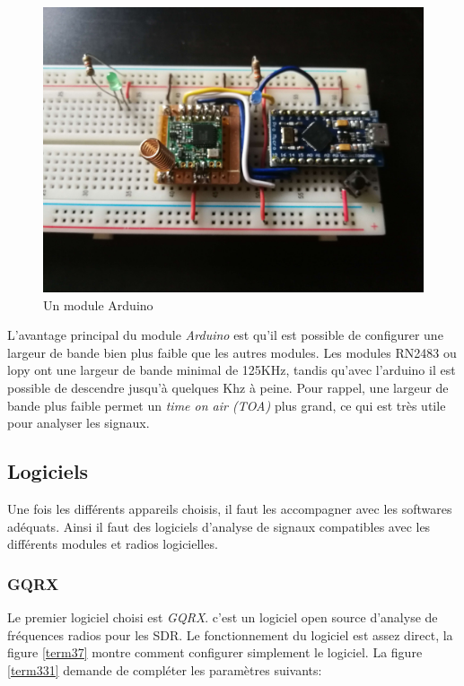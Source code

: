 \begin{figure}[h]
\centering

\includegraphics[scale=0.08]{images/arduino.png}
\caption{Un module Arduino}\label{term36}
\end{figure}

L'avantage principal du module \textit{Arduino} est qu'il est possible de configurer une largeur de bande bien plus faible que les autres modules. Les modules RN2483 ou lopy ont une largeur de bande minimal de 125KHz, tandis qu'avec l'arduino il est possible de descendre jusqu'à quelques Khz à peine. Pour rappel, une largeur de bande plus faible permet un \textit{time on air (TOA)} plus grand, ce qui est très utile pour analyser les signaux. 

\subsection{Logiciels}\label{fft}

Une fois les différents appareils choisis, il faut les accompagner avec les softwares adéquats. Ainsi il faut des logiciels d'analyse de signaux compatibles avec les différents modules et radios logicielles.

\subsubsection{GQRX}

Le premier logiciel choisi est \textit{GQRX}. c'est un logiciel open source d'analyse de fréquences radios pour les SDR. Le fonctionnement du logiciel est assez direct, la figure \ref{term37} montre comment configurer simplement le logiciel. La figure \ref{term331} demande de compléter les paramètres suivants:


